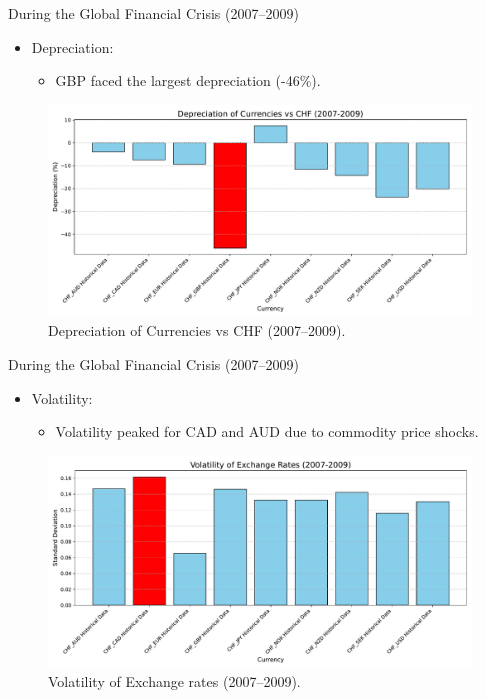 \documentclass{beamer}
\begin{document}
\begin{frame}{During the Global Financial Crisis (2007--2009)}
  \begin{itemize}
    \item Depreciation:
    \begin{itemize}
      \item GBP faced the largest depreciation (-46\%).
    \end{itemize}
   \end{itemize}

    \begin{figure}
    \centering
        \includegraphics[width=0.75
        \textwidth]{../../images/depreciation_2007_2009.pdf}
        \caption{Depreciation of Currencies vs CHF (2007--2009).}
        \label{fig:question}
    \end{figure}
    
\end{frame}


\begin{frame}{During the Global Financial Crisis (2007--2009)}
  \begin{itemize}
     \item Volatility:
    \begin{itemize}
      \item Volatility peaked for CAD and AUD due to commodity price shocks.
    \end{itemize}
   \end{itemize}

    \begin{figure}
    \centering
        \includegraphics[width=0.75
        \textwidth]{../../images/volatility_2007_2009.pdf}
        \caption{Volatility of Exchange rates (2007--2009).}
        \label{fig:question}
    \end{figure}
    
\end{frame}
\end{document}
